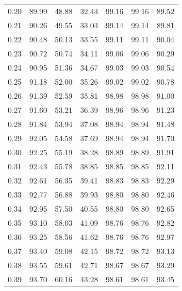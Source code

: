 \begin{tabular}{|c|c|c|c|c|c|c|}
      0.20 &     89.99 &     48.88 &      32.43 &   99.16 &      99.16 &         89.52 \\
      0.21 &     90.26 &     49.55 &      33.03 &   99.14 &      99.14 &         89.81 \\
      0.22 &     90.48 &     50.13 &      33.55 &   99.11 &      99.11 &         90.04 \\
      0.23 &     90.72 &     50.74 &      34.11 &   99.06 &      99.06 &         90.29 \\
      0.24 &     90.95 &     51.36 &      34.67 &   99.03 &      99.03 &         90.54 \\
      0.25 &     91.18 &     52.00 &      35.26 &   99.02 &      99.02 &         90.78 \\
      0.26 &     91.39 &     52.59 &      35.81 &   98.98 &      98.98 &         91.00 \\
      0.27 &     91.60 &     53.21 &      36.39 &   98.96 &      98.96 &         91.23 \\
      0.28 &     91.84 &     53.94 &      37.08 &   98.94 &      98.94 &         91.48 \\
      0.29 &     92.05 &     54.58 &      37.69 &   98.94 &      98.94 &         91.70 \\
      0.30 &     92.25 &     55.19 &      38.28 &   98.89 &      98.89 &         91.91 \\
      0.31 &     92.43 &     55.78 &      38.85 &   98.85 &      98.85 &         92.11 \\
      0.32 &     92.61 &     56.35 &      39.41 &   98.83 &      98.83 &         92.29 \\
      0.33 &     92.77 &     56.88 &      39.93 &   98.80 &      98.80 &         92.46 \\
      0.34 &     92.95 &     57.50 &      40.55 &   98.80 &      98.80 &         92.65 \\
      0.35 &     93.10 &     58.03 &      41.09 &   98.76 &      98.76 &         92.82 \\
      0.36 &     93.25 &     58.56 &      41.62 &   98.76 &      98.76 &         92.97 \\
      0.37 &     93.40 &     59.08 &      42.15 &   98.72 &      98.72 &         93.13 \\
      0.38 &     93.55 &     59.61 &      42.71 &   98.67 &      98.67 &         93.29 \\
      0.39 &     93.70 &     60.16 &      43.28 &   98.61 &      98.61 &         93.45 \\

\end{tabular}
